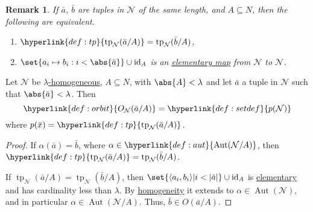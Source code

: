 \documentclass{article}
\let\models\vDash
\DeclareMathOperator{\Aut}{Aut}
\DeclareMathOperator{\tp}{tp}
\newtheorem{nremark}[nthm]{Remark}
\newcommand{\named}[1]{\textbf{#1}\index{#1}}
\begin{document}
\begin{nremark}\label{rem:6.12}
  If $\bar{a}$, $\bar{b}$ are tuples in $\mathcal{N}$ of the same length, and $A\subseteq N$, then the following are equivalent.
  \begin{enumerate}[label=(\roman*)]
    \item $\hyperlink{def:tp}{\tp_{\mathcal{N}}(\bar{a}/A)}= \tp_{\mathcal{N}}(\bar{b}/A)$,
    \item $ \set{a_i\mapsto b_i : i < \abs{\bar{a}}}\cup\text{id}_A $ is an \hyperlink{def:el}{elementary map} from $\mathcal{N}$ to $\mathcal{N}$.
  \end{enumerate}
\end{nremark}
\begin{nprop}\label{prop:6.13}
  Let $ \mathcal{N} $ be \hyperlink{def:homogeneous}{$\lambda$-homogeneous}, $A\subseteq N$, with $\abs{A}<\lambda$ and let $\bar{a}$ a tuple in $\mathcal{N}$ such that $\abs{\bar{a}}<\lambda$.
  Then
  \begin{equation*}\hyperlink{def:orbit}{O_{\mathcal{N}}(\bar{a}/A)}=\hyperlink{def:setdef}{p(\mathcal{N})}\end{equation*}
  where $p(\bar{x})=\hyperlink{def:tp}{\tp_{\mathcal{N}}(\bar{a}/A)}$.
\end{nprop}
\begin{proof}
  If $\alpha(\bar{a})=\bar{b}$, where $\alpha\in\hyperlink{def:aut}{\Aut(\mathcal{N}/A)}$, then $\hyperlink{def:tp}{\tp_{\mathcal{N}}(\bar{a}/A)}=\tp_{\mathcal{N}}(\bar{b}/A) $.

  If $\tp_{\mathcal{N}}(\bar{a}/A)=\tp_{\mathcal{N}}(\bar{b}/A)$, then $\set{\langle a_i, b_i \rangle | i < |\bar{a}|} \cup \operatorname{id}_A$ is \hyperlink{def:elmap}{elementary} and has cardinality less than $\lambda$. By \hyperlink{def:homogeneous}{homogeneity} it extends to $\alpha\in\Aut(\mathcal{N})$, and in particular $\alpha \in \Aut(\mathcal{N}/A)$. Thus, $\bar b \in O(\bar a / A)$.
\end{proof}
\end{document}
